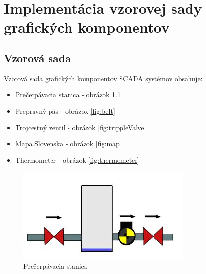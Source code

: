 \chapter{Implementácia vzorovej sady grafických komponentov}

\section{Vzorová sada}
Vzorová sada grafických komponentov SCADA systémov obsahuje:
\begin{itemize}
		\item Prečerpávacia stanica - obrázok \ref{fig:pump}
			\item Prepravný pás - obrázok \ref{fig:belt}
	\item Trojcestný ventil - obrázok \ref{fig:trippleValve}
	\item Mapa Slovenska - obrázok \ref{fig:map}
	\item Thermometer - obrázok \ref{fig:thermometer}

\end{itemize}


\begin{figure}[H]
	\centering
	\includegraphics[width=0.7\linewidth]{obrazky/pump}
	\caption{Prečerpávacia stanica}
	\label{fig:pump}
\end{figure}

